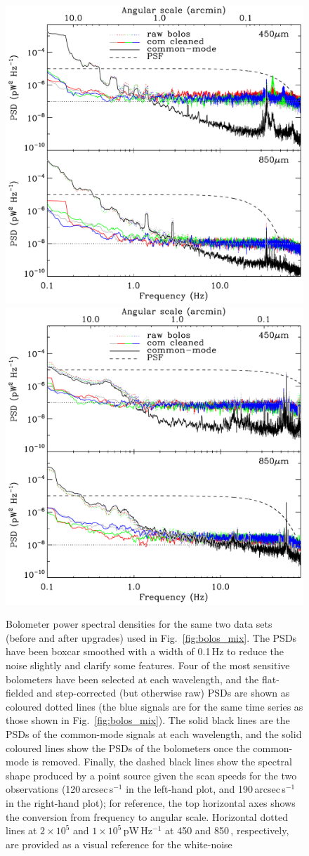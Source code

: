 \documentclass[useAMS,usenatbib,nofootinbib]{mn2e}
\begin{document}
\begin{figure}
\centering
\includegraphics[width=0.49\linewidth]{pspec_s2sro}
\includegraphics[width=0.49\linewidth]{pspec}
\caption{Bolometer power spectral densities for the same two data sets
  (before and after upgrades) used in Fig.~\ref{fig:bolos_mix}. The
  PSDs have been boxcar smoothed with a width of 0.1\,Hz to reduce the
  noise slightly and clarify some features. Four of the most sensitive
  bolometers have been selected at each wavelength, and the
  flat-fielded and step-corrected (but otherwise raw) PSDs are shown
  as coloured dotted lines (the blue signals are for the same time
  series as those shown in Fig.~\ref{fig:bolos_mix}).  The solid black
  lines are the PSDs of the common-mode signals at each wavelength,
  and the solid coloured lines show the PSDs of the bolometers once
  the common-mode is removed.  Finally, the dashed black lines show
  the spectral shape produced by a point source given the scan speeds
  for the two observations (120\,arcsec\,s$^{-1}$ in the left-hand
  plot, and 190\,arcsec\,s$^{-1}$ in the right-hand plot); for
  reference, the top horizontal axes shows the conversion from
  frequency to angular scale. Horizontal dotted lines at $2 \times
  10^5$ and $1 \times 10^5$\,pW\,Hz$^{-1}$ at 450 and 850\,\micron,
  respectively, are provided as a visual reference for the white-noise
}
\end{figure}
\end{document}
